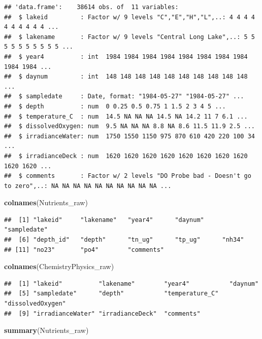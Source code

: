 \documentclass[12pt,]{article}
\newenvironment{Shaded}{\begin{snugshade}}{\end{snugshade}}
\newcommand{\KeywordTok}[1]{\textcolor[rgb]{0.13,0.29,0.53}{\textbf{#1}}}
\newcommand{\NormalTok}[1]{#1}
\begin{document}
\begin{verbatim}
## 'data.frame':    38614 obs. of  11 variables:
##  $ lakeid         : Factor w/ 9 levels "C","E","H","L",..: 4 4 4 4 4 4 4 4 4 4 ...
##  $ lakename       : Factor w/ 9 levels "Central Long Lake",..: 5 5 5 5 5 5 5 5 5 5 ...
##  $ year4          : int  1984 1984 1984 1984 1984 1984 1984 1984 1984 1984 ...
##  $ daynum         : int  148 148 148 148 148 148 148 148 148 148 ...
##  $ sampledate     : Date, format: "1984-05-27" "1984-05-27" ...
##  $ depth          : num  0 0.25 0.5 0.75 1 1.5 2 3 4 5 ...
##  $ temperature_C  : num  14.5 NA NA NA 14.5 NA 14.2 11 7 6.1 ...
##  $ dissolvedOxygen: num  9.5 NA NA NA 8.8 NA 8.6 11.5 11.9 2.5 ...
##  $ irradianceWater: num  1750 1550 1150 975 870 610 420 220 100 34 ...
##  $ irradianceDeck : num  1620 1620 1620 1620 1620 1620 1620 1620 1620 1620 ...
##  $ comments       : Factor w/ 2 levels "DO Probe bad - Doesn't go to zero",..: NA NA NA NA NA NA NA NA NA NA ...
\end{verbatim}

\begin{Shaded}
\begin{Highlighting}[]
\KeywordTok{colnames}\NormalTok{(Nutrients_raw)}
\end{Highlighting}
\end{Shaded}

\begin{verbatim}
##  [1] "lakeid"     "lakename"   "year4"      "daynum"     "sampledate"
##  [6] "depth_id"   "depth"      "tn_ug"      "tp_ug"      "nh34"      
## [11] "no23"       "po4"        "comments"
\end{verbatim}

\begin{Shaded}
\begin{Highlighting}[]
\KeywordTok{colnames}\NormalTok{(ChemistryPhysics_raw)}
\end{Highlighting}
\end{Shaded}

\begin{verbatim}
##  [1] "lakeid"          "lakename"        "year4"           "daynum"         
##  [5] "sampledate"      "depth"           "temperature_C"   "dissolvedOxygen"
##  [9] "irradianceWater" "irradianceDeck"  "comments"
\end{verbatim}

\begin{Shaded}
\begin{Highlighting}[]
\KeywordTok{summary}\NormalTok{(Nutrients_raw)}
\end{Highlighting}
\end{Shaded}
\end{document}
